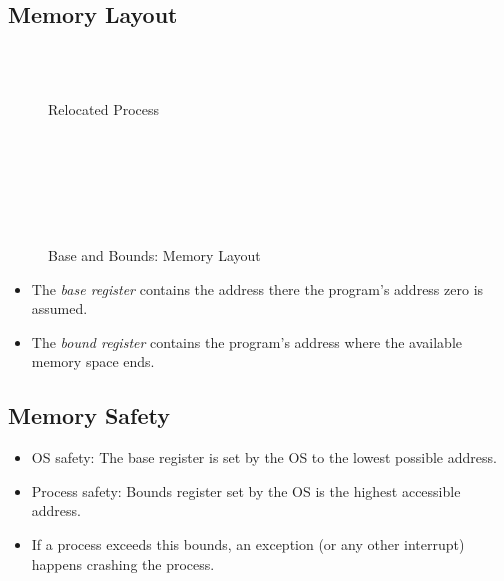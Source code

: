 		\subsection{Memory Layout}
			\begin{figure}[H]
				\centering
				\begin{bytefield}{16}
					 \\
					 \\
					\begin{rightwordgroup}{Relocated Process}
						 \\
						 \\
						 \\
						\skippedwords \\
						 \\
					\end{rightwordgroup} \\
				\end{bytefield}
				\caption{Base and Bounds: Memory Layout}
			\end{figure}
			\begin{itemize}
				\item The \textit{base register} contains the address there the program's address zero is assumed.
				\item The \textit{bound register} contains the program's address where the available memory space ends.
			\end{itemize}

		\subsection{Memory Safety}
			\begin{itemize}
				\item OS safety: The base register is set by the OS to the lowest possible address.
				\item Process safety: Bounds register set by the OS is the highest accessible address.
				\item If a process exceeds this bounds, an exception (or any other interrupt) happens crashing the process.
			\end{itemize}

